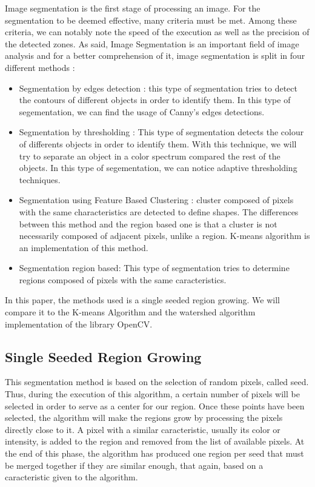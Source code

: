 \documentclass[conference]{IEEEtran}
\begin{document}
Image segmentation is the first stage of processing an image. For the segmentation to be deemed effective, many criteria must be met. Among these criteria, we can notably note the speed of the execution as well as the precision of the detected zones. As said, Image Segmentation is an important field of image analysis and for a better comprehension of it, image segmentation is split in four different methods :

\begin{itemize}
\item Segmentation by edges detection : this type of segmentation tries to detect the contours of different objects in order to identify them. In this type of segementation, we can find the usage of Canny's edges detections.
\item Segmentation by thresholding : This type of segmentation detects the colour of differents objects in order to identify them. With this technique, we will try to separate an object in a color spectrum compared the rest of the objects. In this type of segementation, we can notice adaptive thresholding techniques.
\item Segmentation using Feature Based Clustering : cluster composed of pixels with the same characteristics are detected to define shapes. The differences between this method and the region based one is that a cluster is not necessarily composed of adjacent pixels, unlike a region. K-means algorithm is an implementation of this method.
\item Segmentation region based: This type of segmentation tries to determine regions composed of pixels with the same caracteristics. 
\end{itemize}

In this paper, the methods used is a single seeded region growing. We will compare it to the K-means Algorithm and the watershed algorithm implementation of the library OpenCV.

\subsection{Single Seeded Region Growing}

This segmentation method is based on the selection of random pixels, called seed. Thus, during the execution of this algorithm, a certain number of pixels will be selected in order to serve as a center for our region. Once these points have been selected, the algorithm will make the regions grow by processing the pixels directly close to it. A pixel with a similar caracteristic, usually its color or intensity, is added to the region and removed from the list of available pixels. At the end of this phase, the algorithm has produced one region per seed that must be merged together if they are similar enough, that again, based on a caracteristic given to the algorithm.
\end{document}
